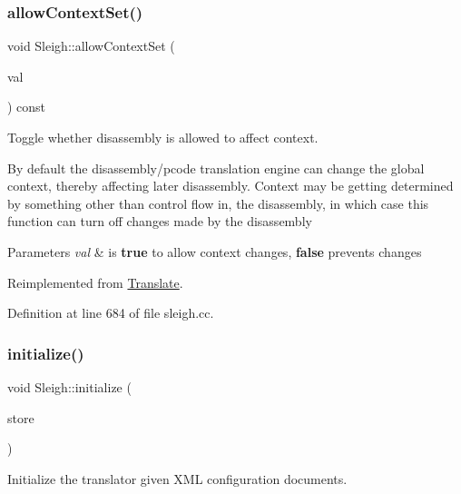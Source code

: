 \subsubsection{\texorpdfstring{allowContextSet()}{allowContextSet()}}
{\footnotesize\ttfamily void Sleigh\+::allow\+Context\+Set (\begin{DoxyParamCaption}\item[{bool}]{val }\end{DoxyParamCaption}) const\hspace{0.3cm}{\ttfamily [virtual]}}



Toggle whether disassembly is allowed to affect context. 

By default the disassembly/pcode translation engine can change the global context, thereby affecting later disassembly. Context may be getting determined by something other than control flow in, the disassembly, in which case this function can turn off changes made by the disassembly 
\begin{DoxyParams}{Parameters}
{\em val} & is {\bfseries{true}} to allow context changes, {\bfseries{false}} prevents changes \\
\hline
\end{DoxyParams}


Reimplemented from \mbox{\hyperlink{class_translate_ae74cac44825c3979c65c105bc66cd63c}{Translate}}.



Definition at line 684 of file sleigh.\+cc.

\mbox{\label{class_sleigh_aca7ce17e881917e515aa45ea48810e45}} 
\subsubsection{\texorpdfstring{initialize()}{initialize()}}
{\footnotesize\ttfamily void Sleigh\+::initialize (\begin{DoxyParamCaption}\item[{\mbox{\hyperlink{class_document_storage}{Document\+Storage}} \&}]{store }\end{DoxyParamCaption})\hspace{0.3cm}{\ttfamily [virtual]}}



Initialize the translator given X\+ML configuration documents. 

